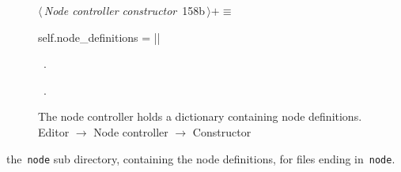 \documentclass[%
    a4paper,    %
    justified,  %
    nobib,      %
    openany     %
]{tufte-book}
\makeatletter
\renewcommand{\label}[1]{\@tufte@label{##1}}%
\makeatother
\begin{document}
\begin{figure}[!htbp]
\begin{flushleft} \small
\begin{minipage}{\linewidth}\label{scrap121}\raggedright\small
{} $\langle\,${\itshape Node controller constructor}\nobreak\ {\footnotesize {158b}}$\,\rangle+\equiv$
\vspace{-1ex}
\begin{pythoncode}
    self.node_definitions = {}
|\NWsep|
\end{pythoncode}
\vspace{1.5ex}
\footnotesize
\begin{list}{}{\setlength{\itemsep}{-\parsep}\setlength{\itemindent}{-\leftmargin}}
\item \NWtxtMacroDefBy\ .
\item \NWtxtMacroRefIn\ .

\item{}
\end{list}
\end{minipage}\vspace{4ex}
\end{flushleft}
\caption{The node controller holds a dictionary containing node definitions.
  \newline{}\newline{}Editor $\rightarrow$ Node controller $\rightarrow$
  Constructor}
\end{figure}

 the~\verb=node= sub directory, containing
the node definitions, for files ending in~\verb=node=.
\end{document}
